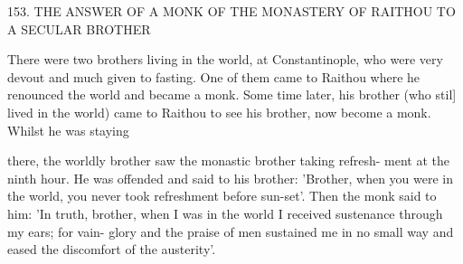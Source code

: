 153. THE ANSWER OF A MONK OF THE MONASTERY
OF RAITHOU TO A SECULAR BROTHER

There were two brothers living in the world, at Constantinople, who
were very devout and much given to fasting. One of them came to
Raithou where he renounced the world and became a monk. Some
time later, his brother (who stil] lived in the world) came to Raithou
to see his brother, now become a monk. Whilst he was staying

there, the worldly brother saw the monastic brother taking refresh-
ment at the ninth hour. He was offended and said to his brother:
'Brother, when you were in the world, you never took refreshment
before sun-set'. Then the monk said to him: 'In truth, brother, when
I was in the world I received sustenance through my ears; for vain-
glory and the praise of men sustained me in no small way and eased
the discomfort of the austerity'.


